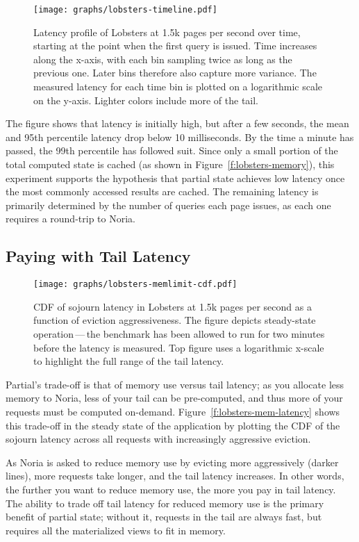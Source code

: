 \begin{figure}[t]
  \centering
  \texttt{[image: graphs/lobsters-timeline.pdf]}
  \caption{Latency profile of Lobsters at 1.5k pages per second over time,
  starting at the point when the first query is issued. Time increases along the
  x-axis, with each bin sampling twice as long as the previous one. Later bins
  therefore also capture more variance. The measured latency for each time bin
  is plotted on a logarithmic scale on the y-axis. Lighter colors include more
  of the tail.} \label{f:lobsters-timeline}
\end{figure}

The figure shows that latency is initially high, but after a few seconds, the
mean and 95th percentile latency drop below 10 milliseconds. By the time a
minute has passed, the 99th percentile has followed suit. Since only a small
portion of the total computed state is cached (as shown in
Figure~\vref{f:lobsters-memory}), this experiment supports the hypothesis that
partial state achieves low latency once the most commonly accessed results are
cached. The remaining latency is primarily determined by the number of queries
each page issues, as each one requires a round-trip to Noria.

\subsection{Paying with Tail Latency}

\begin{figure}[h]
  \centering
  \texttt{[image: graphs/lobsters-memlimit-cdf.pdf]}
  \caption{CDF of sojourn latency in Lobsters at 1.5k pages per second as
  a function of eviction aggressiveness. The figure depicts steady-state
  operation\,---\,the benchmark has been allowed to run for two minutes before
  the latency is measured. Top figure uses a logarithmic x-scale to highlight
  the full range of the tail latency.}
  \label{f:lobsters-mem-latency}
\end{figure}

Partial's trade-off is that of memory use versus tail latency; as you allocate
less memory to Noria, less of your tail can be pre-computed, and thus more of
your requests must be computed on-demand. Figure~\vref{f:lobsters-mem-latency}
shows this trade-off in the steady state of the application by plotting the CDF
of the sojourn latency across all requests with increasingly aggressive
eviction.

As Noria is asked to reduce memory use by evicting more aggressively (darker
lines), more requests take longer, and the tail latency increases. In other
words, the further you want to reduce memory use, the more you pay in tail
latency. The ability to trade off tail latency for reduced memory use is the
primary benefit of partial state; without it, requests in the tail are always
fast, but requires all the materialized views to fit in memory.

